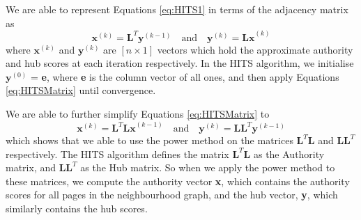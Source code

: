\documentclass[11pt]{report}
\begin{document}
We are able to represent Equations \eqref{eq:HITS1} in terms of the adjacency matrix as \begin{equation} \label{eq:HITSMatrix}
\textbf{x}^{(k)} = \textbf{L}^T\textbf{y}^{(k-1)}\quad\mathrm{and}\quad \textbf{y}^{(k)}=\textbf{Lx}^{(k)}
\end{equation} where \(\textbf{x}^{(k)}\) and \(\textbf{y}^{(k)}\) are $[\textit{n}\times 1]$ vectors which hold the approximate authority and hub scores at each iteration respectively. In the HITS algorithm, we initialise $\textbf{y}^{(0)}$ = \textbf{e}, where \textbf{e} is the column vector of all ones, and then apply Equations \eqref{eq:HITSMatrix} until convergence. 

We are able to further simplify Equations \eqref{eq:HITSMatrix} to \begin{equation} \label{eq:HITSSimplify}
\textbf{x}^{(k)} = \textbf{L}^T\textbf{Lx}^{(k-1)}\quad\mathrm{and}\quad \textbf{y}^{(k)}=\textbf{LL}^T\textbf{y}^{(k-1)}
\end{equation} which shows that we able to use the power method on the matrices $\textbf{L}^T\textbf{L}$ and $\textbf{LL}^T$ respectively. The HITS algorithm defines the matrix $\textbf{L}^T\textbf{L}$ as the Authority matrix, and $\textbf{LL}^T$ as the Hub matrix. So when we apply the power method to these matrices, we compute the authority vector \textbf{x}, which contains the authority scores for all pages in the neighbourhood graph, and the hub vector, \textbf{y}, which similarly contains the hub scores.
\end{document}
